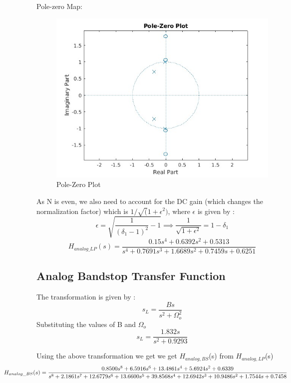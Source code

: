 \documentclass{article}
\begin{document}
Pole-zero Map:
\begin{figure}[H]
    \centering
    \hspace*{-3.8cm}
    \includegraphics[scale=0.5]{root_bsf.jpg}
    \caption{Pole-Zero Plot}
    \label{fig:my_label}
\end{figure}

As N is even, we also need to account for the DC gain (which changes the normalization factor) which is $1/\sqrt(1+\epsilon^2)$, where $\epsilon$ is given by :
\begin{equation*}
    \epsilon = \sqrt{\frac{1}{(\delta_1 - 1)^2} - 1} \implies \frac{1}{\sqrt{1 + \epsilon^2}} = 1 - \delta_1
\end{equation*}
\begin{equation}
    H_{analog\_LP}(s) = \frac{0.15s^4 + 0.6392s^2 + 0.5313}{s^4 + 0.7691s^3 + 1.6689s^2 + 0.7459s + 0.6251}
\end{equation}

\subsection{Analog Bandstop Transfer Function}
The transformation is given by :
\begin{equation*}
    s_L = \frac{Bs}{s^2 + \Omega_o^2 }
\end{equation*}
Substituting the values of B and $\Omega_o$
\begin{equation*}
    s_L = \frac{1.832s}{s^2 + 0.9293}
\end{equation*}

Using the above transformation we get we get $H_{analog,BS}$(s)  from $H_{analog,LP}$(s)
\begin{equation*}
    \hspace*{-2cm}
    H_{analog\_BS}(s) = \frac{0.8500s^8 + 6.5916s^6 + 13.4861s^4 + 5.6924s^2 + 0.6339}{s^8 + 2.1861s^7 + 12.6779s^6 + 13.6600s^5 + 39.8568s^4 + 12.6942s^3 + 10.9486s^2 + 1.7544s + 0.7458}
\end{equation*}
\end{document}
